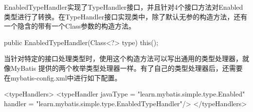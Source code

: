 EnabledTypeHandler实现了TypeHandler接口，并且针对4个接口方法对Enabled类型进行了转换。在TypeHandler接口实现类中，除了默认无参的构造方法，还有一个隐含的带有一个Class参数的构造方法。

\begin{Java}
public EnabledTypeHandler(Class<?> type) {
    this();
}
\end{Java}

当针对特定的接口处理类型时，使用这个构造方法可以写出通用的类型处理器，就像MyBatis 提供的两个枚举类型处理器一样。有了自己的类型处理器后，还需要在mybatis-config.xml中进行如下配置。

\begin{xml}
<typeHandlers>
    <typeHandler javaType = "learn.mybatis.simple.type.Enabled" handler = "learn.mybatis.simple.type.EnabledTypeHandler"/>
</typeHandlers>
\end{xml}

\newpage